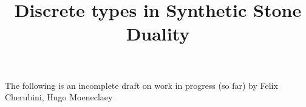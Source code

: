 \documentclass{../util/zariski}
\title{Discrete types in Synthetic Stone Duality}
\begin{document}
\maketitle

The following is an incomplete draft on work in progress (so far)
by Felix Cherubini, Hugo Moeneclaey

\tableofcontents



\printindex

\printbibliography
\end{document}
